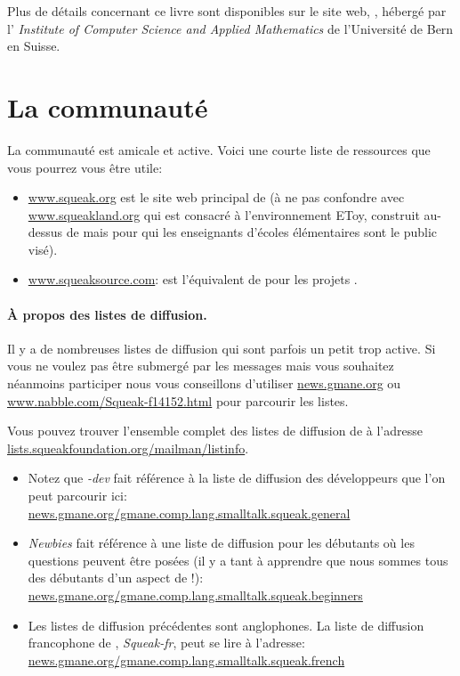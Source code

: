 \documentclass[a4paper,10pt,twoside]{book}
\begin{document}
Plus de d\'etails concernant ce livre sont disponibles sur le site
web, \spe, h\'eberg\'e par l' \emph{Institute of Computer Science and
  Applied Mathematics} de l'Universit\'e de Bern en Suisse.

\section*{La communaut\'e \sq}

La communaut\'e \sq est amicale et active.
Voici une courte liste de ressources que vous pourrez vous \^etre utile:

\begin{itemize}
\item \url{www.squeak.org} est le site web principal de \sq (\`a ne
  pas confondre avec  \url{www.squeakland.org} qui est consacr\'e \`a
  l'environnement EToy, construit au-dessus de \sq mais pour qui
  les enseignants d'\'ecoles \'el\'ementaires sont le public vis\'e).

\item \url{www.squeaksource.com}: \squeaksource est l'\'equivalent de \sourceforge pour les projets \sq.
\end{itemize}

\paragraph{\`A propos des listes de diffusion.} Il y a de nombreuses listes de diffusion qui sont parfois un petit trop active. Si vous ne voulez pas \^etre submerg\'e par les messages mais vous souhaitez n\'eanmoins participer nous vous conseillons d'utiliser \url{news.gmane.org} ou \url{www.nabble.com/Squeak-f14152.html} pour parcourir les listes.

Vous pouvez trouver l'ensemble complet des listes de diffusion de \sq \`a l'adresse \url{lists.squeakfoundation.org/mailman/listinfo}.

\begin{itemize}
\item Notez que \emph{\sq-dev} fait r\'ef\'erence \`a la liste de diffusion des d\'eveloppeurs  que l'on peut parcourir ici:\\
\url{news.gmane.org/gmane.comp.lang.smalltalk.squeak.general}
\item \emph{Newbies} fait r\'ef\'erence \`a une liste de diffusion
  pour les d\'ebutants o\`u les questions peuvent \^etre pos\'ees (il
  y a tant \`a apprendre que nous sommes tous des d\'ebutants d'un
  aspect de \sq!):\\
\url{news.gmane.org/gmane.comp.lang.smalltalk.squeak.beginners}
\item Les listes de diffusion pr\'ec\'edentes sont anglophones. La
  liste de diffusion francophone de \sq, \emph{Squeak-fr}, peut se
  lire \`a l'adresse:\\
\url{news.gmane.org/gmane.comp.lang.smalltalk.squeak.french}
\end{itemize}
\end{document}
